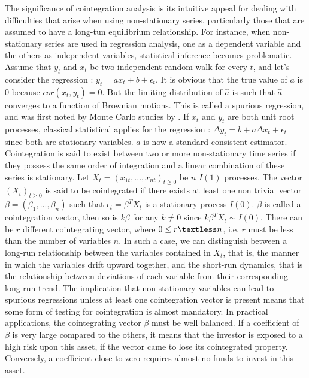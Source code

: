 \documentclass[11pt,a4,twosided,singlespacing,titlepagenumber=on]{scrreprt}
\numberwithin{equation}{chapter} %
\theoremstyle{remark}
\begin{document}
\noindent
The significance of cointegration analysis is its intuitive appeal for dealing with difficulties that arise when using non-stationary series, particularly those that are assumed to have a long-tun equilibrium relationship. For instance, when non-stationary series are used in regression analysis, one as a dependent variable and the others as independent variables, statistical inference becomes problematic. Assume that $y_t$ and $x_t$ be two independent random walk for every $t$, and let's consider the regression : $y_t = a x_t + b + \epsilon_t$. It is obvious that the true value of $a$ is 0 because $cor(x_t, y_t) = 0$. But the limiting distribution of $\hat{a}$ is such that $\hat{a}$ converges to a function of Brownian motions. This is called a spurious regression, and was first noted by Monte Carlo studies by \cite{granger1974}. If $x_t$ and $y_t$ are both unit root processes, classical statistical applies for the regression : $\Delta y_t = b + a \Delta x_t + \epsilon_t$ since both are stationary variables. $\hat{a}$ is now a standard consistent estimator. \\

\noindent
Cointegration is said to exist between two or more non-stationary time series if they possess the same order of integration and a linear combination of these series is stationary. Let $X_t = (x_{1t},...,x_{nt})_{t \geq 0}$ be $n$ $I(1)$ processes. The vector $(X_t)_{t \geq 0}$ is said to be cointegrated if there exists at least one non trivial vector $\beta = (\beta_1,...,\beta_n)$ such that $\epsilon_t = \beta^T X_t$ is a stationary process $I(0)$. $\beta$ is called a cointegration vector, then so is $k \beta$ for any $k \neq 0$ since $k\beta^TX_t \sim I(0)$. There can be $r$ different cointegrating vector, where $0 \leq r \textless n$, i.e. $r$ must be less than the number of variables $n$. In such a case, we can distinguish between a long-run relationship between the variables contained in $X_t$, that is, the manner in which the variables drift upward together, and the short-run dynamics, that is the relationship between deviations of each variable from their corresponding long-run trend. The implication that non-stationary variables can lead to spurious regressions unless at least one cointegration vector is present means that some form of testing for cointegration is almost mandatory. In practical applications, the cointegrating vector $\beta$ must be well balanced. If a coefficient of $\beta$ is very large compared to the others, it means that the investor is exposed to a high risk upon this asset, if the vector came to lose its cointegrated property. Conversely, a coefficient close to zero requires almost no funds to invest in this asset.
\end{document}
